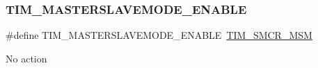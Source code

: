 \subsubsection{\texorpdfstring{TIM\_MASTERSLAVEMODE\_ENABLE}{TIM\_MASTERSLAVEMODE\_ENABLE}}
{\footnotesize\ttfamily \#define T\+I\+M\+\_\+\+M\+A\+S\+T\+E\+R\+S\+L\+A\+V\+E\+M\+O\+D\+E\+\_\+\+E\+N\+A\+B\+LE~\mbox{\hyperlink{group___peripheral___registers___bits___definition_ga52101db4ca2c7b3003f1b16a49b2032c}{T\+I\+M\+\_\+\+S\+M\+C\+R\+\_\+\+M\+SM}}}

No action 